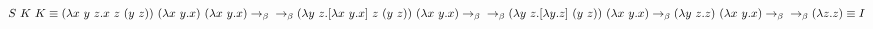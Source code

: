 \documentclass[12pt]{article}
\begin{document}
\large

\noindent
$
S\ K\ K \equiv
(\lambda x\ y\ z.x\ z\ (y\ z))\ (\lambda x\ y.x)\ (\lambda x\ y.x) \rightarrow_\beta \\
\rightarrow_\beta (\lambda y\ z.[\lambda x\ y.x]\ z\ (y\ z))\ (\lambda x\ y.x) \rightarrow_\beta \\
\rightarrow_\beta (\lambda y\ z.[\lambda y.z]\ (y\ z))\ (\lambda x\ y.x) \rightarrow_\beta (\lambda y\ z.z)\ (\lambda x\ y.x) \rightarrow_\beta \\
\rightarrow_\beta (\lambda z. z) \equiv I
$
\end{document}
